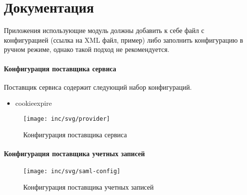 \section{Документация}

Приложения использующие модуль должны добавить к себе файл с конфигурацией (ссылка на XML файл, пример) либо заполнить конфигурацию в ручном режиме, однако такой подход не рекомендуется.

\paragraph{Конфигурация поставщика сервиса}
Поставщик сервиса содержит следующий набор конфигураций.
\begin{itemize}
\item cookieexpire
\end{itemize}

\begin{figure}[H]
  \centering
  \texttt{[image: inc/svg/provider]}
  \caption{Конфигурация поставщика сервиса}
  \label{fig:runConfig}
\end{figure}

\paragraph{Конфигурация поставщика учетных записей}

\begin{figure}[H]
  \centering
  \texttt{[image: inc/svg/saml-config]}
  \caption{Конфигурация поставщика учетных записей}
  \label{fig:samlConfig}
\end{figure}


